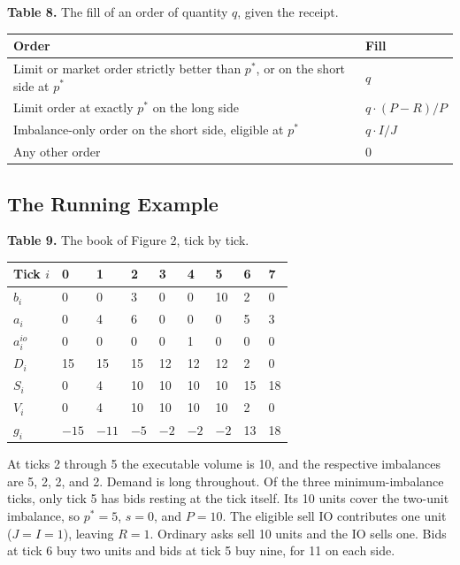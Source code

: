 \textbf{Table 8.} The fill of an order of quantity \(q\), given the receipt.

\begin{longtable}[]{@{}ll@{}}
\toprule\noalign{}
Order & Fill \\
\midrule\noalign{}
\endhead
\bottomrule\noalign{}
\endlastfoot
Limit or market order strictly better than \(p^*\), or on the short side at \(p^*\) & \(q\) \\
Limit order at exactly \(p^*\) on the long side & \(q \cdot (P - R)/P\) \\
Imbalance-only order on the short side, eligible at \(p^*\) & \(q \cdot I/J\) \\
Any other order & 0 \\
\end{longtable}

\subsection{The Running Example}

\textbf{Table 9.} The book of Figure 2, tick by tick.

\begin{longtable}[]{@{}lllllllll@{}}
\toprule\noalign{}
Tick \(i\) & 0 & 1 & 2 & 3 & 4 & 5 & 6 & 7 \\
\midrule\noalign{}
\endhead
\bottomrule\noalign{}
\endlastfoot
\(b_i\) & 0 & 0 & 3 & 0 & 0 & 10 & 2 & 0 \\
\(a_i\) & 0 & 4 & 6 & 0 & 0 & 0 & 5 & 3 \\
\(a^{io}_i\) & 0 & 0 & 0 & 0 & 1 & 0 & 0 & 0 \\
\(D_i\) & 15 & 15 & 15 & 12 & 12 & 12 & 2 & 0 \\
\(S_i\) & 0 & 4 & 10 & 10 & 10 & 10 & 15 & 18 \\
\(V_i\) & 0 & 4 & 10 & 10 & 10 & 10 & 2 & 0 \\
\(g_i\) & \(-15\) & \(-11\) & \(-5\) & \(-2\) & \(-2\) & \(-2\) & 13 & 18 \\
\end{longtable}

At ticks 2 through 5 the executable volume is 10, and the respective imbalances are 5, 2, 2, and 2. Demand is long throughout. Of the three minimum-imbalance ticks, only tick 5 has bids resting at the tick itself. Its 10 units cover the two-unit imbalance, so \(p^*=5\), \(s=0\), and \(P=10\). The eligible sell IO contributes one unit (\(J=I=1\)), leaving \(R=1\). Ordinary asks sell 10 units and the IO sells one. Bids at tick 6 buy two units and bids at tick 5 buy nine, for 11 on each side.

